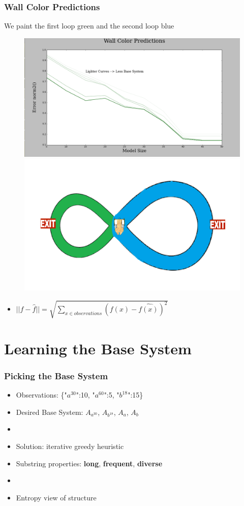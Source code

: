 \documentclass{beamer}
\begin{document}
\begin{frame}
\frametitle{Wall Color Predictions}
We paint the first loop green and the second loop blue
\begin{figure}
\includegraphics[width=0.6\linewidth]{lucasplots/monImages/WallColorPredictions.png}
\includegraphics[width=0.4\linewidth]{lucasplots/monImages/doubleLoopImageMO.png}

\end{figure}

\begin{itemize}

\item[] $||f - \hat{f}|| = \sqrt{\sum\nolimits_{x \in observations}(f(x) - \hat{f(x)})^2}$ 
\end{itemize}

\end{frame}



\section{Learning the Base System}

\begin{frame}
\frametitle{Picking the Base System}
\begin{itemize}


\item Observations: \{"$a^{30}$":10, "$a^{60}$":5, "$b^{18}$":15\}

\item[] Desired Base System: $A_{a^{30}}$, $A_{b^{18}}$, $A_a$, $A_b$
\item[]

\item Solution: iterative greedy heuristic 
\item Substring properties: 
\textbf{long}, \textbf{frequent}, \textbf{diverse}
\item[]
\item Entropy view of structure


\end{itemize}
\end{frame}
\end{document}
